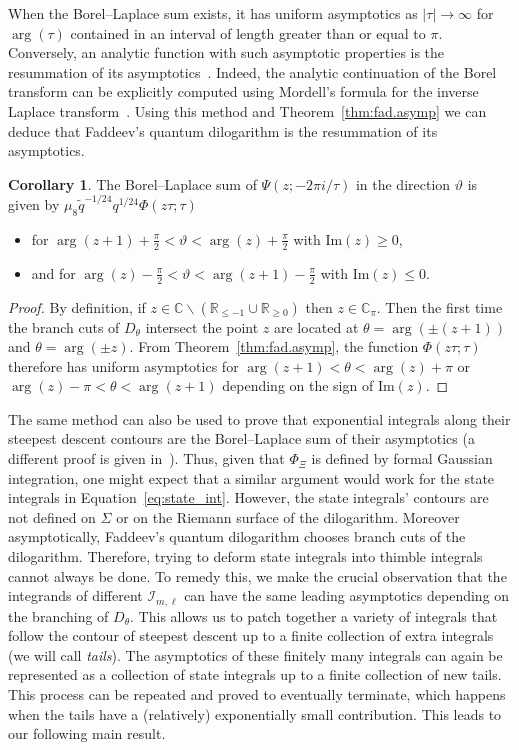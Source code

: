 \documentclass[12pt,reqno]{amsart}
\theoremstyle{definition}
\newtheorem{corollary}[theorem]{Corollary}
\def\BR{\mathbb R}
\def\BC{\mathbb C}
\def\calI{\mathcal I}
\def\th{\theta}
\def\Im{\mathrm{Im}}
\renewcommand{\=}{\;=\;}
\newcommand{\tq}{\widetilde q}
\begin{document}
When the Borel--Laplace sum exists, it has uniform asymptotics as $|\tau|\to\infty$ for~$\arg(\tau)$ contained in an interval of length greater than or equal to $\pi$. Conversely, an analytic function with such asymptotic properties is the resummation of its asymptotics~\cite{nevanlinna}. Indeed, the analytic continuation of the Borel transform can be explicitly computed using Mordell's formula for the inverse Laplace transform~\cite{watson.reg}. 
Using this method and Theorem~\ref{thm:fad.asymp} we can deduce that Faddeev's quantum dilogarithm is the resummation of its asymptotics.
\begin{corollary}\label{cor:fad.resum}
The Borel--Laplace sum of $\Psi(z;-2\pi i/\tau)$ in the direction $\vartheta$ is given by $\mu_8\tq^{-1/24}q^{1/24}\Phi(z\tau;\tau)$
\begin{itemize}
  \item for $\arg(z+1)+\tfrac{\pi}{2}<\vartheta<\arg(z)+\tfrac{\pi}{2}$ with $\Im(z)\geq0$,
  \item and for $\arg(z)-\tfrac{\pi}{2}<\vartheta<\arg(z+1)-\tfrac{\pi}{2}$ with $\Im(z)\leq0$.
\end{itemize}
\end{corollary}
\begin{proof}
By definition, if $z\in\BC\backslash(\BR_{\leq-1}\cup\BR_{\geq0})$ then $z\in\BC_\pi$. Then the first time the branch cuts of $D_{\theta}$ intersect the point $z$ are located at $\theta=\arg(\pm(z+1))$ and $\theta=\arg(\pm z)$. From Theorem~\ref{thm:fad.asymp}, the function $\Phi(z\tau;\tau)$ therefore has uniform asymptotics for $\arg(z+1)<\theta<\arg(z)+\pi$ or $\arg(z)-\pi<\theta<\arg(z+1)$ depending on the sign of $\Im(z)$.
\end{proof}
The same method can also be used to prove that exponential integrals along their steepest descent contours are the Borel--Laplace sum of their asymptotics (a different proof is given in~\cite{borel_reg}). Thus, given that $\Phi_\Xi$ is defined by formal Gaussian integration, one might expect that a similar argument would work for the state integrals in Equation~\eqref{eq:state_int}. However, the state integrals' contours are not defined on $\Sigma$ or on the Riemann surface of the dilogarithm. Moreover asymptotically, Faddeev's quantum dilogarithm chooses branch cuts of the dilogarithm. Therefore, trying to deform state integrals into thimble integrals cannot always be done. To remedy this, we make the crucial observation that the integrands of different $\calI_{m,\ell}$ can have the same leading asymptotics depending on the branching of $D_{\th}$. This allows us to patch together a variety of integrals that follow the contour of steepest descent up to a finite collection of extra integrals (we will call {\em tails}). The asymptotics of these finitely many integrals can again be represented as a collection of state integrals up to a finite collection of new tails. This process can be repeated and proved to eventually terminate, which happens when the tails have a (relatively) exponentially small contribution. This leads to our following main result.
\end{document}
